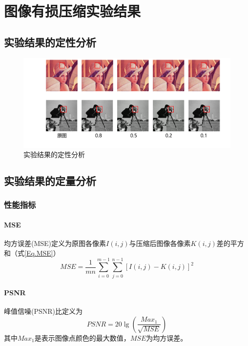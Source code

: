 \chapter{图像有损压缩实验结果}

\section{实验结果的定性分析}
\begin{figure}
    \centering
    \includegraphics[width=1.0\textwidth]{pages/evaluation/result-image.png}
    \caption{实验结果的定性分析}
    \label{Fig.result}
\end{figure}

\section{实验结果的定量分析}
\subsection{性能指标}

\subsubsection{MSE}
均方误差(MSE)定义为原图各像素$I(i,j)$与压缩后图像各像素$K(i,j)$差的平方和（式\ref{Eq.MSE}）
\begin{equation}
    MSE=\frac{1}{mn} \sum_{i=0}^{m-1}\sum_{j=0}^{n-1} [I(i,j)-K(i,j)]^2
    \label{Eq.MSE}
\end{equation}

\subsubsection{PSNR}
峰值信噪(PSNR)比定义为
\begin{equation}
    PSNR=20\lg (\frac{Max_1}{\sqrt{MSE}})
    \label{Eq.PSNR}
\end{equation}
其中$Max_1$是表示图像点颜色的最大数值，$MSE$为均方误差。


